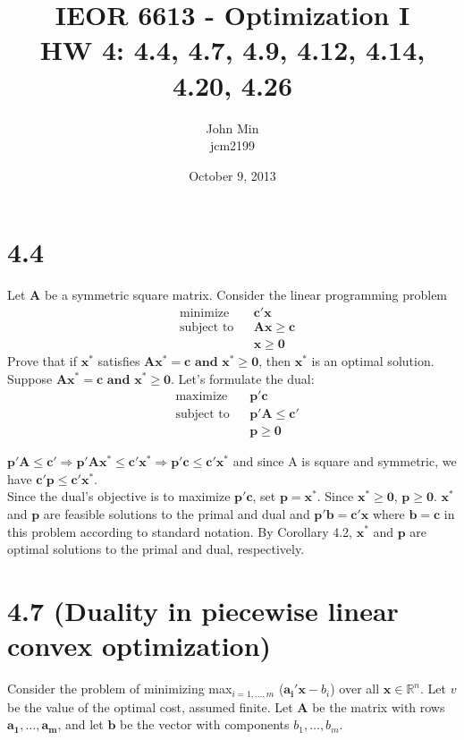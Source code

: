 \documentclass{article}
\begin{document}
\title{IEOR 6613 - Optimization I\\ HW 4:  4.4, 4.7, 4.9, 4.12, 4.14, 4.20, 4.26}

\author{John Min\\ jcm2199}
\date{October 9, 2013}
\maketitle
\pagebreak

\section*{4.4}
Let \textbf{A} be a symmetric square matrix.  Consider the linear programming problem
\begin{equation*}
\begin{aligned}
& \text{minimize} && \mathbf{c'x} \\
& \text{subject to} &&  \mathbf{Ax \geq c} \\
& & &\mathbf{x \geq 0}
\end{aligned}
\end{equation*}
Prove that if $\mathbf{x^*}$ satisfies $\mathbf{Ax^* = c \text{ and } x^* \geq 0}$, then $\mathbf{x^*}$ is an optimal solution.\\

\noindent
Suppose $\mathbf{Ax^* = c \text{ and } x^* \geq 0}$.  Let's formulate the dual:
\begin{equation*}
\begin{aligned}
& \text{maximize} && \mathbf{p'c} \\
& \text{subject to} &&  \mathbf{p'A \leq c'} \\
& & &\mathbf{p \geq 0}
\end{aligned}
\end{equation*}

\noindent
$\mathbf{p'A \leq c'} \Rightarrow \mathbf{p'Ax^* \leq c'x^*} \Rightarrow \mathbf{p'c \leq c'x^*}$ and since A is square and symmetric, we have $\mathbf{c'p \leq c'x^*}$.\\
Since the dual's objective is to maximize $\mathbf{p'c}$, set $\mathbf{p = x^*}.$  Since $\mathbf{x^* \geq 0}$, $\mathbf{p \geq 0}$.  $\mathbf{x^*}$ and $\mathbf{p}$ are feasible solutions to the primal and dual and $\mathbf{p'b = c'x}$ where $\mathbf{b=c}$ in this problem according to standard notation.  By Corollary 4.2, $\mathbf{x^*}$ and $\mathbf{p}$ are optimal solutions to the primal and dual, respectively.  

\section*{4.7 (Duality in piecewise linear convex optimization)}
Consider the problem of minimizing max$_{i=1,\ldots, m}$ ($\mathbf{a_i'x} - b_i$) over all $\mathbf{x} \in \mathbb{R}^n$.  Let $v$ be the value of the optimal cost, assumed finite.  Let $\mathbf{A}$ be the matrix with rows $\mathbf{a_1, \ldots, a_m}$, and let $\mathbf{b}$ be the vector with components $b_1, \ldots, b_m$.  \\
\end{document}
